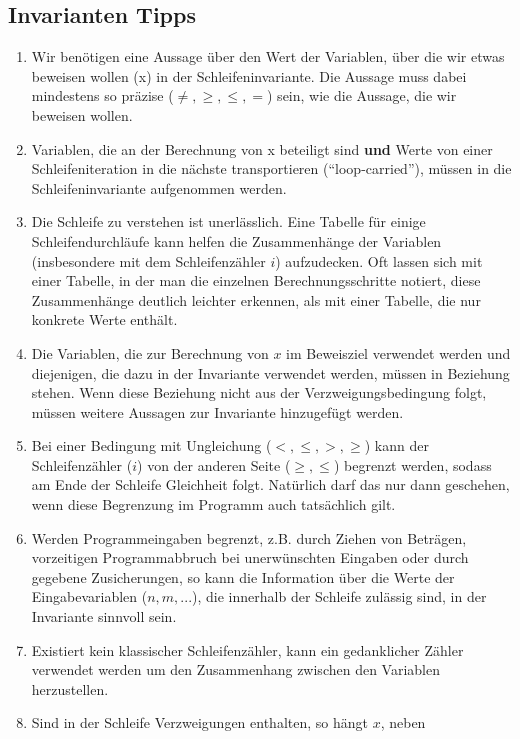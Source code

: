 \documentclass[a4paper,8pt,landscape]{extarticle}
\begin{document}
\begin{multicols*}{3}
    \subsection{Invarianten Tipps}
    \begin{enumerate}
     \item Wir benötigen eine Aussage über den Wert der Variablen, über die
wir etwas beweisen wollen (x) in der Schleifeninvariante. Die
Aussage muss dabei mindestens so präzise ($\neq, \geq, \leq, =$) sein, wie
die Aussage, die wir beweisen wollen.
      \item Variablen, die an der Berechnung von x beteiligt sind \textbf{und} Werte
von einer Schleifeniteration in die nächste transportieren
(“loop-carried”), müssen in die Schleifeninvariante aufgenommen
werden.
      \item Die Schleife zu verstehen ist unerlässlich. Eine Tabelle für einige
Schleifendurchläufe kann helfen die Zusammenhänge der Variablen
(insbesondere mit dem Schleifenzähler $i$) aufzudecken. Oft lassen
sich mit einer Tabelle, in der man die einzelnen
Berechnungsschritte notiert, diese Zusammenhänge deutlich
leichter erkennen, als mit einer Tabelle, die nur konkrete Werte
enthält.
      \item Die Variablen, die zur Berechnung von $x$ im Beweisziel verwendet
werden und diejenigen, die dazu in der Invariante verwendet
werden, müssen in Beziehung stehen. Wenn diese Beziehung nicht
aus der Verzweigungsbedingung folgt, müssen weitere Aussagen
zur Invariante hinzugefügt werden.
      \item Bei einer Bedingung mit Ungleichung ($<, \leq, >, \geq$) kann der
Schleifenzähler ($i$) von der anderen Seite ($\geq, \leq$) begrenzt werden,
sodass am Ende der Schleife Gleichheit folgt. Natürlich darf das
nur dann geschehen, wenn diese Begrenzung im Programm auch
tatsächlich gilt.
      \item Werden Programmeingaben begrenzt, z.B. durch Ziehen von
Beträgen, vorzeitigen Programmabbruch bei unerwünschten
Eingaben oder durch gegebene Zusicherungen, so kann die
Information über die Werte der Eingabevariablen ($n, m, ...$), die
innerhalb der Schleife zulässig sind, in der Invariante sinnvoll sein.
      \item Existiert kein klassischer Schleifenzähler, kann ein gedanklicher
Zähler verwendet werden um den Zusammenhang zwischen den
Variablen herzustellen.
      \item Sind in der Schleife Verzweigungen enthalten, so hängt $x$, neben

\end{enumerate}
\end{multicols*}
\end{document}
